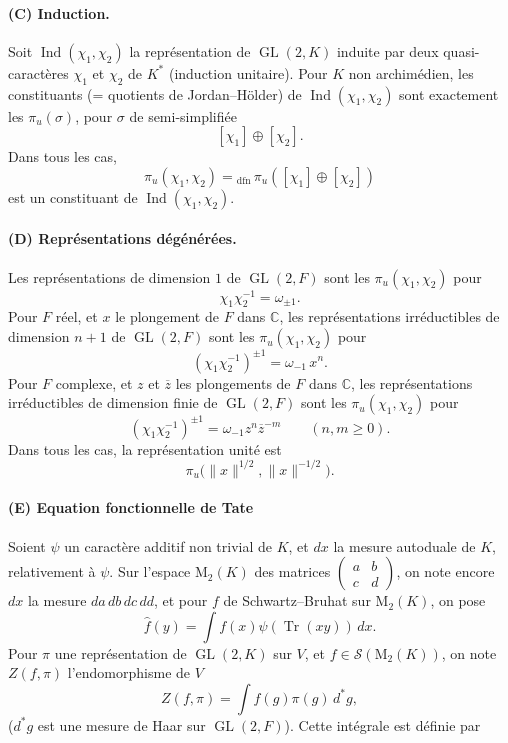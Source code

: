 \documentclass[10pt,a4paper]{article}
\providecommand{\GL}{\operatorname{GL}}
\providecommand{\Tr}{\operatorname{Tr}}
\providecommand{\Ind}{\operatorname{Ind}}
\providecommand{\C}{\mathbb C}
\providecommand{\M}{\mathrm M}
\providecommand{\cS}{\mathcal S}
\begin{document}
\clearpage
{}
\hypertarget{authority-43}{}
\paragraph{(C) Induction.} Soit \(\Ind(\chi_1,\chi_2)\) la représentation de \(\GL(2,K)\) induite par deux quasi-caractères \(\chi_1\) et \(\chi_2\) de \(K^*\) (induction unitaire). Pour \(K\) non archimédien, les constituants (= quotients de Jordan--Hölder) de \(\Ind(\chi_1,\chi_2)\) sont exactement les \(\pi_u(\sigma)\), pour \(\sigma\) de semi-simplifiée
\[
[\chi_1]\oplus[\chi_2].
\]
Dans tous les cas,
\[
\pi_u(\chi_1,\chi_2)={}_{\mathrm{dfn}}\,\pi_u([\chi_1]\oplus[\chi_2])
\]
est un constituant de \(\Ind(\chi_1,\chi_2)\).

\paragraph{(D) Représentations dégénérées.} Les représentations de dimension \(1\) de \(\GL(2,F)\) sont les \(\pi_u(\chi_1,\chi_2)\) pour
\[
\chi_1\chi_2^{-1}=\omega_{\pm1}.
\]
Pour \(F\) réel, et \(x\) le plongement de \(F\) dans \(\C\), les représentations irréductibles de dimension \(n+1\) de \(\GL(2,F)\) sont les \(\pi_u(\chi_1,\chi_2)\) pour
\[
(\chi_1\chi_2^{-1})^{\pm1}=\omega_{-1}\,x^n.
\]
Pour \(F\) complexe, et \(z\) et \(\overline z\) les plongements de \(F\) dans \(\C\), les représentations irréductibles de dimension finie de \(\GL(2,F)\) sont les \(\pi_u(\chi_1,\chi_2)\) pour
\[
(\chi_1\chi_2^{-1})^{\pm1}=\omega_{-1}z^n\overline z^{-m}\qquad(n,m\ge0).
\]
Dans tous les cas, la représentation unité est
\[
\pi_u\bigl(\|x\|^{1/2},\|x\|^{-1/2}\bigr).
\]

\paragraph{(E) Equation fonctionnelle de Tate} Soient \(\psi\) un caractère additif non trivial de \(K\), et \(dx\) la mesure autoduale de \(K\), relativement à \(\psi\). Sur l'espace \(\M_2(K)\) des matrices \(\left(\begin{smallmatrix}a&b\\ c&d\end{smallmatrix}\right)\), on note encore \(dx\) la mesure \(da\,db\,dc\,dd\), et pour \(f\) de Schwartz--Bruhat sur \(\M_2(K)\), on pose
\[
\widehat f(y)=\int f(x)\psi(\Tr(xy))\,dx.
\]
Pour \(\pi\) une représentation de \(\GL(2,K)\) sur \(V\), et \(f\in\cS(\M_2(K))\), on note \(Z(f,\pi)\) l'endomorphisme de \(V\)
\[
Z(f,\pi)=\int f(g)\pi(g)\,d^*g,
\]
(\(d^*g\) est une mesure de Haar sur \(\GL(2,F)\)). Cette intégrale est définie par
\end{document}
